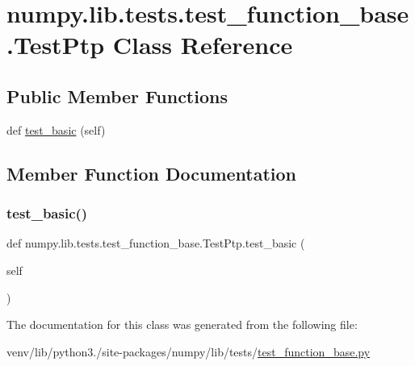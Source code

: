 \hypertarget{classnumpy_1_1lib_1_1tests_1_1test__function__base_1_1TestPtp}{}\section{numpy.\+lib.\+tests.\+test\+\_\+function\+\_\+base.\+Test\+Ptp Class Reference}
\label{classnumpy_1_1lib_1_1tests_1_1test__function__base_1_1TestPtp}
\subsection*{Public Member Functions}
\begin{DoxyCompactItemize}
\item 
def \hyperlink{classnumpy_1_1lib_1_1tests_1_1test__function__base_1_1TestPtp_aad294bb30cab28219d9de0e0048b27d1}{test\+\_\+basic} (self)
\end{DoxyCompactItemize}


\subsection{Member Function Documentation}
\mbox{\label{classnumpy_1_1lib_1_1tests_1_1test__function__base_1_1TestPtp_aad294bb30cab28219d9de0e0048b27d1}} 
\subsubsection{\texorpdfstring{test\+\_\+basic()}{test\_basic()}}
{\footnotesize\ttfamily def numpy.\+lib.\+tests.\+test\+\_\+function\+\_\+base.\+Test\+Ptp.\+test\+\_\+basic (\begin{DoxyParamCaption}\item[{}]{self }\end{DoxyParamCaption})}



The documentation for this class was generated from the following file\+:\begin{DoxyCompactItemize}
\item 
venv/lib/python3./site-\/packages/numpy/lib/tests/\hyperlink{lib_2tests_2test__function__base_8py}{test\+\_\+function\+\_\+base.\+py}\end{DoxyCompactItemize}
